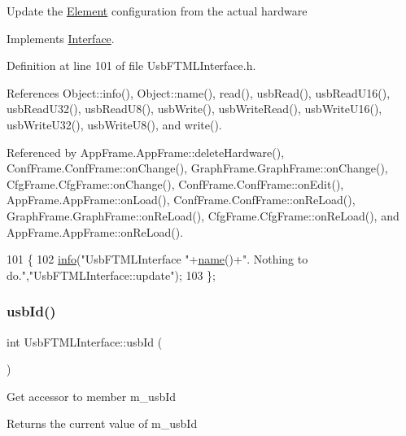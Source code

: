 Update the \hyperlink{classElement}{Element} configuration from the actual hardware 

Implements \hyperlink{classInterface_a30e71ffbe36091df9f7c0838dd4b60d2}{Interface}.



Definition at line 101 of file Usb\+F\+T\+M\+L\+Interface.\+h.



References Object\+::info(), Object\+::name(), read(), usb\+Read(), usb\+Read\+U16(), usb\+Read\+U32(), usb\+Read\+U8(), usb\+Write(), usb\+Write\+Read(), usb\+Write\+U16(), usb\+Write\+U32(), usb\+Write\+U8(), and write().



Referenced by App\+Frame.\+App\+Frame\+::delete\+Hardware(), Conf\+Frame.\+Conf\+Frame\+::on\+Change(), Graph\+Frame.\+Graph\+Frame\+::on\+Change(), Cfg\+Frame.\+Cfg\+Frame\+::on\+Change(), Conf\+Frame.\+Conf\+Frame\+::on\+Edit(), App\+Frame.\+App\+Frame\+::on\+Load(), Conf\+Frame.\+Conf\+Frame\+::on\+Re\+Load(), Graph\+Frame.\+Graph\+Frame\+::on\+Re\+Load(), Cfg\+Frame.\+Cfg\+Frame\+::on\+Re\+Load(), and App\+Frame.\+App\+Frame\+::on\+Re\+Load().


\begin{DoxyCode}
101                          \{
102     \hyperlink{classObject_a644fd329ea4cb85f54fa6846484b84a8}{info}(\textcolor{stringliteral}{"UsbFTMLInterface "}+\hyperlink{classObject_a300f4c05dd468c7bb8b3c968868443c1}{name}()+\textcolor{stringliteral}{". Nothing to do."},\textcolor{stringliteral}{"UsbFTMLInterface::update"});
103   \};
\end{DoxyCode}
\mbox{\label{classUsbFTMLInterface_a99016c7661780ed89195dc507d3516fc}} 
\subsubsection{\texorpdfstring{usb\+Id()}{usbId()}}
{\footnotesize\ttfamily int Usb\+F\+T\+M\+L\+Interface\+::usb\+Id (\begin{DoxyParamCaption}{ }\end{DoxyParamCaption})\hspace{0.3cm}{\ttfamily [inline]}}

Get accessor to member m\+\_\+usb\+Id \begin{DoxyReturn}{Returns}
the current value of m\+\_\+usb\+Id 
\end{DoxyReturn}


